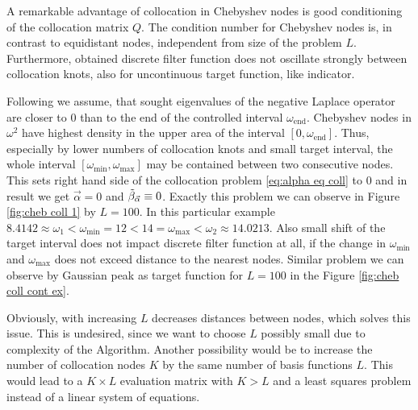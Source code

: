 \documentclass[a4paper,11pt,bibliography=totoc,listof=totoc,headinclude=true,cleardoublepage=empty,oneside]{scrbook}
\newcommand{\dffv}{\Tilde{\beta}_{\Vec{\alpha}}}
\newcommand{\e}{\mathrm{end}}
\begin{document}
A remarkable advantage of collocation in Chebyshev nodes is good conditioning of the collocation matrix $Q$. The condition number for Chebyshev nodes is, in contrast to equidistant nodes, independent from size of the problem $L$. Furthermore, obtained discrete filter function does not oscillate strongly between collocation knots, also for uncontinuous target function, like indicator.  

Following \cite{nannen} we assume, that sought eigenvalues of the negative Laplace operator are closer to 0 than to the end of the controlled interval $\omega_\e$. Chebyshev nodes in $\omega^2$ have highest density in the upper area of the interval $[0, \omega_\e]$. Thus, especially by lower numbers of collocation knots and small target interval, the whole interval $\left[\omega_{\min}, \omega_{\max} \right]$ may be contained between two consecutive nodes. This sets right hand side of the collocation problem \eqref{eq:alpha eq coll} to 0 and in result we get $\Vec{\alpha}=0$ and $\dffv \equiv 0$. Exactly this problem we can observe in Figure \ref{fig:cheb coll 1} by $L=100$. In this particular example $ 8.4142\approx\omega_1 < \omega_{\min} = 12  <  14 = \omega_{\max}  < \omega_2 \approx 14.0213 $. Also small shift of the target interval does not impact discrete filter function at all, if the change in $\omega_{\min}$ and $\omega_{\max}$ does not exceed distance to the nearest nodes. Similar problem we can observe by Gaussian peak as target function for $L=100$ in the Figure \ref{fig:cheb coll cont ex}. 

Obviously, with increasing $L$ decreases distances between nodes, which solves this issue. This is undesired, since we want to choose $L$ possibly small due to complexity of the Algorithm. Another possibility would be to increase the number of collocation nodes $K$ by the same number of basis functions $L$. This would lead to a $K\times L$ evaluation matrix with $K>L$ and a least squares problem instead of a linear system of equations.
\end{document}
